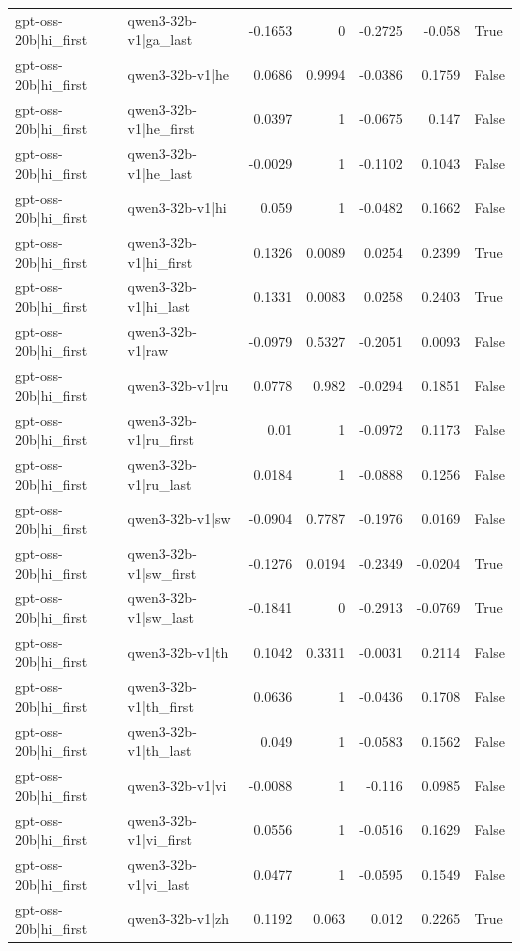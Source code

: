 \begin{table}
\begin{tabular}{l l r r r r l}
gpt-oss-20b|hi_first & qwen3-32b-v1|ga_last & -0.1653 & 0 & -0.2725 & -0.058 & True \\
gpt-oss-20b|hi_first & qwen3-32b-v1|he & 0.0686 & 0.9994 & -0.0386 & 0.1759 & False \\
gpt-oss-20b|hi_first & qwen3-32b-v1|he_first & 0.0397 & 1 & -0.0675 & 0.147 & False \\
gpt-oss-20b|hi_first & qwen3-32b-v1|he_last & -0.0029 & 1 & -0.1102 & 0.1043 & False \\
gpt-oss-20b|hi_first & qwen3-32b-v1|hi & 0.059 & 1 & -0.0482 & 0.1662 & False \\
gpt-oss-20b|hi_first & qwen3-32b-v1|hi_first & 0.1326 & 0.0089 & 0.0254 & 0.2399 & True \\
gpt-oss-20b|hi_first & qwen3-32b-v1|hi_last & 0.1331 & 0.0083 & 0.0258 & 0.2403 & True \\
gpt-oss-20b|hi_first & qwen3-32b-v1|raw & -0.0979 & 0.5327 & -0.2051 & 0.0093 & False \\
gpt-oss-20b|hi_first & qwen3-32b-v1|ru & 0.0778 & 0.982 & -0.0294 & 0.1851 & False \\
gpt-oss-20b|hi_first & qwen3-32b-v1|ru_first & 0.01 & 1 & -0.0972 & 0.1173 & False \\
gpt-oss-20b|hi_first & qwen3-32b-v1|ru_last & 0.0184 & 1 & -0.0888 & 0.1256 & False \\
gpt-oss-20b|hi_first & qwen3-32b-v1|sw & -0.0904 & 0.7787 & -0.1976 & 0.0169 & False \\
gpt-oss-20b|hi_first & qwen3-32b-v1|sw_first & -0.1276 & 0.0194 & -0.2349 & -0.0204 & True \\
gpt-oss-20b|hi_first & qwen3-32b-v1|sw_last & -0.1841 & 0 & -0.2913 & -0.0769 & True \\
gpt-oss-20b|hi_first & qwen3-32b-v1|th & 0.1042 & 0.3311 & -0.0031 & 0.2114 & False \\
gpt-oss-20b|hi_first & qwen3-32b-v1|th_first & 0.0636 & 1 & -0.0436 & 0.1708 & False \\
gpt-oss-20b|hi_first & qwen3-32b-v1|th_last & 0.049 & 1 & -0.0583 & 0.1562 & False \\
gpt-oss-20b|hi_first & qwen3-32b-v1|vi & -0.0088 & 1 & -0.116 & 0.0985 & False \\
gpt-oss-20b|hi_first & qwen3-32b-v1|vi_first & 0.0556 & 1 & -0.0516 & 0.1629 & False \\
gpt-oss-20b|hi_first & qwen3-32b-v1|vi_last & 0.0477 & 1 & -0.0595 & 0.1549 & False \\
gpt-oss-20b|hi_first & qwen3-32b-v1|zh & 0.1192 & 0.063 & 0.012 & 0.2265 & True \\

\end{tabular}
\end{table}
